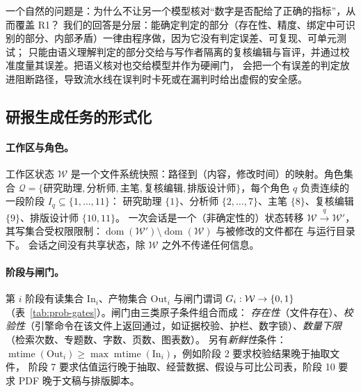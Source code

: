 \begin{tradeoff}
一个自然的问题是：为什么不让另一个模型核对“数字是否配给了正确的指标”，从而覆盖 R1？
我们的回答是分层：能确定判定的部分（存在性、精度、绑定中可识别的部分、内部矛盾）一律由程序做，因为它没有判定误差、可复现、可单元测试；
只能由语义理解判定的部分交给与写作者隔离的复核编辑与盲评，并通过校准度量其误差。把语义核对也交给模型并作为硬闸门，
会把一个有误差的判定放进阻断路径，导致流水线在误判时卡死或在漏判时给出虚假的安全感。
\end{tradeoff}

\subsection{研报生成任务的形式化}
\label{sec:prob-gen}

\paragraph{工作区与角色。}
工作区状态 $\mathcal{W}$ 是一个文件系统快照：路径到（内容，修改时间）的映射。角色集合
$\mathcal{Q}=\{\text{研究助理},\text{分析师},\text{主笔},\text{复核编辑},\text{排版设计师}\}$，每个角色 $q$ 负责连续的一段阶段 $I_q\subseteq\{1,\dots,11\}$：
研究助理 $\{1\}$、分析师 $\{2,\dots,7\}$、主笔 $\{8\}$、复核编辑 $\{9\}$、排版设计师 $\{10,11\}$。
一次会话是一个（非确定性的）状态转移 $\mathcal{W}\xrightarrow{q}\mathcal{W}'$，其写集合受权限限制：$\operatorname{dom}(\mathcal{W}')\setminus\operatorname{dom}(\mathcal{W})$ 与被修改的文件都在  与运行目录下。
会话之间没有共享状态，除 $\mathcal{W}$ 之外不传递任何信息。

\paragraph{阶段与闸门。}
第 $i$ 阶段有读集合 $\mathrm{In}_i$、产物集合 $\mathrm{Out}_i$ 与闸门谓词 $G_i:\mathcal{W}\to\{0,1\}$（表~\ref{tab:prob-gates}）。闸门由三类原子条件组合而成：
\emph{存在性}（文件存在）、\emph{校验性}（引擎命令在该文件上返回通过，如证据校验、护栏、数字锁）、\emph{数量下限}（检索次数、专题数、字数、页数、图表数）。
另有\emph{新鲜性}条件：$\operatorname{mtime}(\mathrm{Out}_i)\ge\max\operatorname{mtime}(\mathrm{In}_i)$，例如阶段 2 要求校验结果晚于抽取文件，
阶段 7 要求估值运行晚于抽取、经营数据、假设与可比公司表，阶段 10 要求 PDF 晚于文稿与排版脚本。


